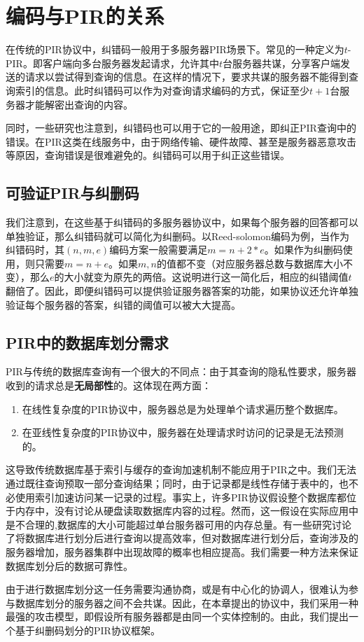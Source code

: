 \section{编码与PIR的关系}
在传统的PIR协议中，纠错码一般用于多服务器PIR场景下。常见的一种定义为$t$-PIR。即客户端向多台服务器发起请求，允许其中$t$台服务器共谋，分享客户端发送的请求以尝试得到查询的信息。在这样的情况下，要求共谋的服务器不能得到查询索引的信息。此时纠错码可以作为对查询请求编码的方式，保证至少$t+1$台服务器才能解密出查询的内容。

同时，一些研究\cite{10.1007/978-3-031-22368-6_3}也注意到，纠错码也可以用于它的一般用途，即纠正PIR查询中的错误。在PIR这类在线服务中，由于网络传输、硬件故障、甚至是服务器恶意攻击等原因，查询错误是很难避免的。纠错码可以用于纠正这些错误。

\subsection{可验证PIR与纠删码}

我们注意到，在这些基于纠错码的多服务器协议中，如果每个服务器的回答都可以单独验证，那么纠错码就可以简化为纠删码。以Reed-solomon编码为例，当作为纠错码时，其$(n,m,e)$编码方案一般需要满足$m=n+2*e$。如果作为纠删码使用，则只需要$m=n+e$。如果$m,n$的值都不变（对应服务器总数与数据库大小不变），那么$e$的大小就变为原先的两倍。这说明进行这一简化后，相应的纠错阈值$t$翻倍了。因此，即便纠错码可以提供验证服务器答案的功能，如果协议还允许单独验证每个服务器的答案，纠错的阈值可以被大大提高。

\subsection{PIR中的数据库划分需求}
PIR与传统的数据库查询有一个很大的不同点：由于其查询的隐私性要求，服务器收到的请求总是\textbf{无局部性}的。这体现在两方面：
\begin{enumerate}
    \item 在线性复杂度的PIR协议中，服务器总是为处理单个请求遍历整个数据库。
    \item 在亚线性复杂度的PIR协议中，服务器在处理请求时访问的记录是无法预测的。
\end{enumerate}

这导致传统数据库基于索引与缓存的查询加速机制不能应用于PIR之中。我们无法通过既往查询预取一部分查询结果；同时，由于记录都是线性存储于表中的，也不必使用索引加速访问某一记录的过程。事实上，许多PIR协议\cite{SimplePIR,VeriSimplePIR,APIR,Checklist,CK20,CHK22,MIR23}假设整个数据库都位于内存中，没有讨论从硬盘读取数据库内容的过程。然而，这一假设在实际应用中是不合理的,数据库的大小可能超过单台服务器可用的内存总量。有一些研究讨论了将数据库进行划分后进行查询\cite{RAID-PIR}以提高效率，但对数据库进行划分后，查询涉及的服务器增加，服务器集群中出现故障的概率也相应提高。我们需要一种方法来保证数据库划分后的数据可靠性。

由于进行数据库划分这一任务需要沟通协商，或是有中心化的协调人，很难认为参与数据库划分的服务器之间不会共谋。因此，在本章提出的协议中，我们采用一种最强的攻击模型，即假设所有服务器都是由同一个实体控制的。由此，我们提出一个基于纠删码划分的PIR协议框架。
